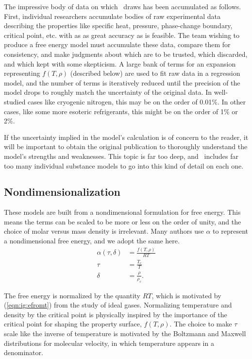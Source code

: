 The impressive body of data on which \PM\ draws has been accumulated as follows.  First, individual researchers accumulate bodies of raw experimental data describing the properties like specific heat, pressure, phase-change boundary, critical point, etc. with as as great accuracy as is feasible.  The team wishing to produce a free energy model must accumulate these data, compare them for consistency, and make judgments about which are to be trusted, which discarded, and which kept with some skepticism.  A large bank of terms for an expansion representing $f(T,\rho)$ (described below) are used to fit raw data in a regression model, and the number of terms is iteratively reduced until the precision of the model drops to roughly match the uncertainty of the original data.  In well-studied cases like cryogenic nitrogen, this may be on the order of 0.01\%.  In other cases, like some more esoteric refrigerants, this might be on the order of 1\% or 2\%.

If the uncertainty implied in the model's calculation is of concern to the reader, it will be important to obtain the original publication to thoroughly understand the model's strengths and weaknesses.  This topic is far too deep, and \PM\ includes far too many individual substance models to go into this kind of detail on each one.

\subsection{Nondimensionalization}\label{sec:mp:nd}

These models are built from a nondimensional formulation for free energy.  This means the terms can be scaled to be more or less on the order of unity, and the choice of molar versus mass density is irrelevant.  Many authors use $\alpha$ to represent a nondimensional free energy, and we adopt the same here.
\begin{subequations}
\begin{align}
\alpha(\tau,\delta) &= \frac{f(T,\rho)}{R T}\\
\tau &= \frac{T_c}{T}\\
\delta &= \frac{\rho}{\rho_c}.
\end{align}
\end{subequations}

The free energy is normalized by the quantity $R T$, which is motivated by (\ref{eqn:ig:efromt}) from the study of ideal gases.  Normalizing temperature and density by the critical point is physically inspired by the importance of the critical point for shaping the property surface, $f(T, \rho)$.  The choice to make $\tau$ scale like the inverse of temperature is motivated by the Boltzmann and Maxwell distributions for molecular velocity, in which temperature appears in a denominator.

